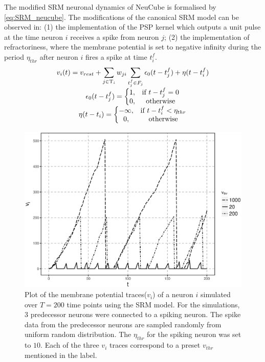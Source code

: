 The modified SRM neuronal dynamics of NeuCube is formalised by \equationname \ref{eq:SRM_neucube}. The modifications of the canonical SRM model can be observed in: (1) the implementation of the PSP kernel which outputs a unit pulse at the time neuron $i$ receives a spike from neuron $j$; (2) the implementation of refractoriness, where the membrane potential is set to negative infinity during the period $\eta_{thr}$ after neuron $i$ fires a spike at time $t_i^f$.
\begin{equation}
\begin{matrix}
\displaystyle v_i(t)=v_{rest}+\sum_{j\in \Tau_i }w_{ji}\sum_{t_j^f\in F_j}\epsilon_0(t-t_j^f)+\eta(t-t_i^f) \\

\epsilon_0(t-t_j^f)=\left\{
\begin{array}{@{}cc@{}}
1, & \text{if}\ t-t_j^f=0 \\
0, & \text{otherwise}
\end{array}\right. \\

\eta(t-t_i)=\left\{
\begin{array}{@{}cc@{}}
-\infty, & \text{if}\ t-t_i^f<\eta_{thr}\\
0, & \text{otherwise}
\end{array}\right.

\end{matrix}
\label{eq:SRM_neucube}
\end{equation}

\begin{figure}
	\centering
	\includegraphics[width=0.8\linewidth]{fig/fmridti/membrane_potential.eps}
	\caption{Plot of the membrane potential traces($v_i$) of a neuron $i$ simulated over $T=200$ time points using the SRM model. For the simulations, $3$ predecessor neurons were connected to a spiking neuron. The spike data from the predecessor neurons are sampled randomly from uniform random distribution. The $\eta_{thr}$ for the spiking neuron was set to $10$. Each of the three $v_i$ traces correspond to a preset $v_{thr}$ mentioned in the label.}
	\label{fig:SRM}
\end{figure}

